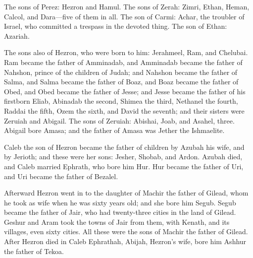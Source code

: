  The sons of Perez: Hezron and Hamul.  The sons
of Zerah: Zimri, Ethan, Heman, Calcol, and Dara---five of them in all.
 The son of Carmi: Achar, the troubler of Israel, who
committed a trespass in the devoted thing.  The son of
Ethan: Azariah.

 The sons also of Hezron, who were born to him: Jerahmeel,
Ram, and Chelubai.  Ram became the father of Amminadab, and
Amminadab became the father of Nahshon, prince of the children of Judah;
 and Nahshon became the father of Salma, and Salma became
the father of Boaz,  and Boaz became the father of Obed,
and Obed became the father of Jesse;  and Jesse became the
father of his firstborn Eliab, Abinadab the second, Shimea the third,
 Nethanel the fourth, Raddai the fifth,  Ozem
the sixth, and David the seventh;  and their sisters were
Zeruiah and Abigail. The sons of Zeruiah: Abishai, Joab, and Asahel,
three.  Abigail bore Amasa; and the father of Amasa was
Jether the Ishmaelite.

 Caleb the son of Hezron became the father of children by
Azubah his wife, and by Jerioth; and these were her sons: Jesher,
Shobab, and Ardon.  Azubah died, and Caleb married Ephrath,
who bore him Hur.  Hur became the father of Uri, and Uri
became the father of Bezalel.

 Afterward Hezron went in to the daughter of Machir the
father of Gilead, whom he took as wife when he was sixty years old; and
she bore him Segub.  Segub became the father of Jair, who
had twenty-three cities in the land of Gilead.  Geshur and
Aram took the towns of Jair from them, with Kenath, and its villages,
even sixty cities. All these were the sons of Machir the father of
Gilead.  After Hezron died in Caleb Ephrathah, Abijah,
Hezron's wife, bore him Ashhur the father of Tekoa.

